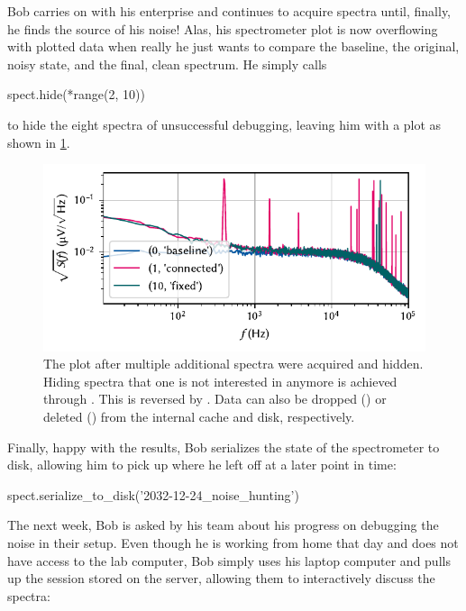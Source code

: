 Bob carries on with his enterprise and continues to acquire spectra until, finally, he finds the source of his noise!
Alas, his spectrometer plot is now overflowing with plotted data when really he just wants to compare the baseline, the original, noisy state, and the final, clean spectrum.
He simply calls

\begin{pycode}
    spect.hide(*range(2, 10))
\end{pycode}

to hide the eight spectra of unsuccessful debugging, leaving him with a plot as shown in \cref{fig:speck:software:workflow:success}.

\begin{figure}
    \centering
    \includegraphics{img/pdf/spectrometer/workflow_success}
    \caption[]{
        The \pyspeck plot after multiple additional spectra were acquired and hidden.
        Hiding spectra that one is not interested in anymore is achieved through .
        This is reversed by .
        Data can also be dropped () or deleted () from the internal cache and disk, respectively.
    }
    \label{fig:speck:software:workflow:success}
\end{figure}

Finally, happy with the results, Bob serializes the state of the spectrometer to disk, allowing him to pick up where he left off at a later point in time:

\begin{pycode}
    spect.serialize_to_disk('2032-12-24_noise_hunting')
\end{pycode}

The next week, Bob is asked by his team about his progress on debugging the noise in their setup.
Even though he is working from home that day and does not have access to the lab computer, Bob simply uses his laptop computer and pulls up the  session stored on the server, allowing them to interactively discuss the spectra:

